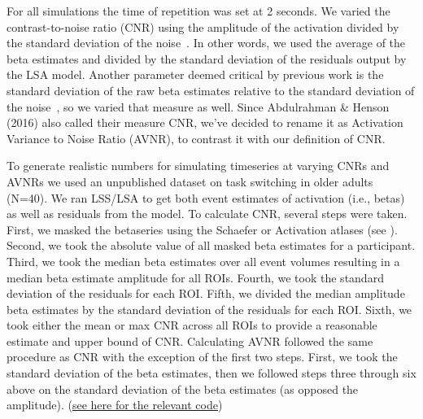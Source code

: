\documentclass[10pt,letterpaper]{article}
\begin{document}
For all simulations the time of repetition was set at 2 seconds.
We varied the contrast-to-noise ratio (CNR) using the amplitude of the activation
divided by the standard deviation of the noise~\cite{Welvaert2013a}.
In other words, we used the average of the beta estimates and divided by the standard
deviation of the residuals output by the LSA model.
Another parameter deemed critical by previous work is the standard deviation
of the raw beta estimates relative to the standard deviation of the noise~\cite{Abdulrahman2016},
so we varied that measure as well.
Since Abdulrahman \& Henson (2016)\cite{Abdulrahman2016} also called their measure
CNR, we've decided to rename it as Activation Variance to Noise Ratio (AVNR), to
contrast it with our definition of CNR.

To generate realistic numbers for simulating timeseries at varying CNRs and AVNRs
we used an unpublished dataset on task switching in older adults (N=40).
We ran LSS/LSA to get both event estimates of activation (i.e., betas)
as well as residuals from the model.
To calculate CNR, several steps were taken.
First, we masked the betaseries using the Schaefer or Activation atlases (see ).
Second, we took the absolute value of all masked beta estimates for a participant.
Third, we took the median beta estimates over all event volumes resulting
in a median beta estimate amplitude for all ROIs.
Fourth, we took the standard deviation of the residuals for each ROI.
Fifth, we divided the median amplitude beta estimates by the standard deviation of the residuals
for each ROI.
Sixth, we took either the mean or max CNR across all ROIs to provide a reasonable estimate
and upper bound of CNR.
Calculating AVNR followed the same procedure as CNR with the exception of the first two steps.
First, we took the standard deviation of the beta estimates, then we followed steps three through six above
on the standard deviation of the beta estimates (as opposed the amplitude).
(\href{https://github.com/jdkent/BetaSeriesRealDataAnalysis/blob/90fafb5b83b2e1bfade61a9fb1a87f225efaa95f/nibsAnalysis/cnr_trial_variability.ipynb}{see here for the relevant code})
\end{document}
